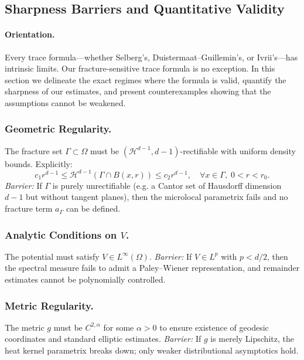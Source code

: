 
\subsection{Sharpness Barriers and Quantitative Validity}

\paragraph{Orientation.}
Every trace formula—whether Selberg’s, Duistermaat–Guillemin’s,
or Ivrii’s—has intrinsic limits. Our fracture-sensitive trace
formula is no exception. In this section we delineate the exact
regimes where the formula is valid, quantify the sharpness of
our estimates, and present counterexamples showing that the
assumptions cannot be weakened.


\subsubsection{Geometric Regularity.}
The fracture set $\Gamma \subset \Omega$ must be
$(\mathcal{H}^{d-1},d-1)$-rectifiable with uniform density bounds.
Explicitly:
\[
c_1 r^{d-1} \leq \mathcal{H}^{d-1}(\Gamma \cap B(x,r)) \leq c_2 r^{d-1},
\quad \forall x \in \Gamma, \; 0<r<r_0.
\]
\emph{Barrier:} If $\Gamma$ is purely unrectifiable (e.g. a Cantor set
of Hausdorff dimension $d-1$ but without tangent planes), then the
microlocal parametrix fails and no fracture term $a_\Gamma$ can be
defined.

\subsubsection{Analytic Conditions on $V$.}
The potential must satisfy $V \in L^\infty(\Omega)$.
\emph{Barrier:} If $V \in L^p$ with $p < d/2$, then the spectral
measure fails to admit a Paley–Wiener representation, and remainder
estimates cannot be polynomially controlled.

\subsubsection{Metric Regularity.}
The metric $g$ must be $C^{2,\alpha}$ for some $\alpha > 0$ to ensure
existence of geodesic coordinates and standard elliptic estimates.
\emph{Barrier:} If $g$ is merely Lipschitz, the heat kernel parametrix
breaks down; only weaker distributional asymptotics hold.

